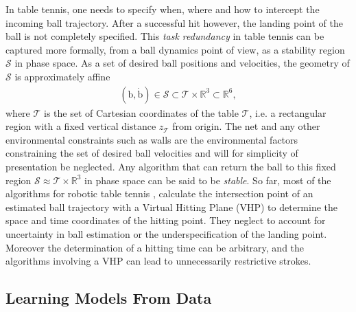 \documentclass[letterpaper, 10 pt, conference]{ieeeconf}
\newcommand{\boldvec}[1]{\boldsymbol{\mathrm{#1}}}
\let\vec\boldvec
\newcommand{\ball}{\vec{b}} %
\newcommand{\stabilityRegion}{\mathcal{S}} %
\newcommand{\court}{\mathcal{T}} %
\begin{document}
In table tennis, one needs to specify when, where and how to intercept the incoming ball trajectory. After a successful hit however, the landing point of the ball is not completely specified. This \emph{task redundancy} in table tennis can be captured more formally, from a ball dynamics point of view, as a stability region $\stabilityRegion$ in phase space. As a set of desired ball positions and velocities, the geometry of $\stabilityRegion$ is approximately affine
%
\begin{align}
(\ball,\dot{\ball}) \in \stabilityRegion \subset \court \times \mathbb{R}^{3} \subset \mathbb{R}^{6},
\label{stabilityRegion}
\end{align}
%
\noindent where $\court$ is the set of Cartesian coordinates of the table $\court$, i.e. a rectangular region with a fixed vertical distance $z_{\court}$ from origin. The net and any other environmental constraints such as walls are the environmental factors constraining the set of desired ball velocities and will for simplicity of presentation be neglected. Any algorithm that can return the ball to this fixed region $\stabilityRegion \approx \court \times \mathbb{R}^3$ in phase space can be said to be \emph{stable}.
%
So far, most of the algorithms for robotic table tennis \cite{Matsushima05}, \cite{Muelling13} calculate the intersection point of an estimated ball trajectory with a Virtual Hitting Plane (VHP) to determine the space and time coordinates of the hitting point. They neglect to account for uncertainty in ball estimation or the underspecification of the landing point. Moreover the determination of a hitting time can be arbitrary, and the algorithms involving a VHP can lead to unnecessarily restrictive strokes. 



\subsection{Learning Models From Data}
\end{document}
